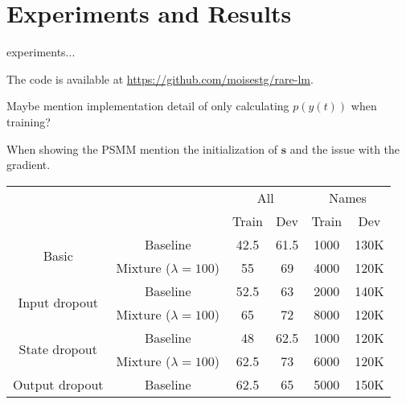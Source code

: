 \chapter{Experiments and Results}
\label{chapter:experiments}

experiments... 

The code is available at \url{https://github.com/moisestg/rare-lm}.

Maybe mention implementation detail of only calculating $p(y(t))$ when training?

When showing the PSMM mention the initialization of $\mathbf{s}$ and the issue with the gradient.

\begin{table}[]
	\centering
	\begin{tabular}{cc|c|c|c|c|}
		\cline{3-6}
		\multicolumn{1}{l}{}                                                    & \multicolumn{1}{l|}{}   & \multicolumn{2}{c|}{All} & \multicolumn{2}{c|}{Names} \\ \cline{3-6} 
		&                         & Train       & Dev        & Train        & Dev         \\ \hline
		\multicolumn{1}{|c|}{\multirow{2}{*}{Basic}}                            & Baseline                & 42.5        & 61.5       & 1000         & 130K        \\ \cline{2-6} 
		\multicolumn{1}{|c|}{}                                                  & Mixture ($\lambda=100$) & 55          & 69         & 4000         & 120K        \\ \hline
		\multicolumn{1}{|c|}{\multirow{2}{*}{Input dropout}}                    & Baseline                & 52.5        & 63         & 2000         & 140K        \\ \cline{2-6} 
		\multicolumn{1}{|c|}{}                                                  & Mixture ($\lambda=100$) & 65          & 72         & 8000         & 120K        \\ \hline
		\multicolumn{1}{|c|}{\multirow{2}{*}{State dropout}}                    & Baseline                & 48          & 62.5       & 1000         & 120K        \\ \cline{2-6} 
		\multicolumn{1}{|c|}{}                                                  & Mixture ($\lambda=100$) & 62.5        & 73         & 6000         & 120K        \\ \hline
		\multicolumn{1}{|c|}{\multirow{2}{*}{Output dropout}}                   & Baseline                & 62.5        & 65         & 5000         & 150K        \\ \cline{2-6} 

\end{tabular}
\end{table}
